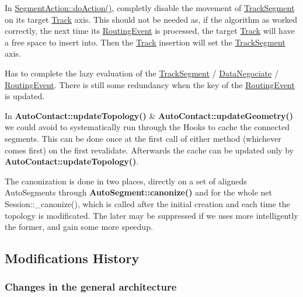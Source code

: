\begin{DoxyItemize}
\item In \mbox{\hyperlink{classKite_1_1SegmentAction_a324f17f0f5a09b76344eb2e003695d74}{Segment\+Action\+::do\+Action()}}, completly disable the movement of \mbox{\hyperlink{classKite_1_1TrackSegment}{Track\+Segment}} on it\textquotesingle{}s target \mbox{\hyperlink{classKite_1_1Track}{Track}} axis. This should not be needed as, if the algorithm as worked correctly, the next time it\textquotesingle{}s \mbox{\hyperlink{classKite_1_1RoutingEvent}{Routing\+Event}} is processed, the target \mbox{\hyperlink{classKite_1_1Track}{Track}} will have a free space to insert into. Then the \mbox{\hyperlink{classKite_1_1Track}{Track}} insertion will set the \mbox{\hyperlink{classKite_1_1TrackSegment}{Track\+Segment}} axis.
\item Has to complete the lazy evaluation of the \mbox{\hyperlink{classKite_1_1TrackSegment}{Track\+Segment}} / \mbox{\hyperlink{classKite_1_1DataNegociate}{Data\+Negociate}} / \mbox{\hyperlink{classKite_1_1RoutingEvent}{Routing\+Event}}. There is still some redundancy when the key of the \mbox{\hyperlink{classKite_1_1RoutingEvent}{Routing\+Event}} is updated.
\item In \textbf{ Auto\+Contact\+::update\+Topology()} \& \textbf{ Auto\+Contact\+::update\+Geometry()} we could avoid to systematically run through the Hooks to cache the connected segments. This can be done once at the first call of either method (whichever comes first) on the first revalidate. Afterwards the cache can be updated only by \textbf{ Auto\+Contact\+::update\+Topology()}.
\item The canonization is done in two places, directly on a set of aligneds Auto\+Segments through \textbf{ Auto\+Segment\+::canonize()} and for the whole net Session\+::\+\_\+canonize(), which is called after the initial creation and each time the topology is modificated. The later may be suppressed if we uses more intelligently the former, and gain some more speedup.
\end{DoxyItemize}\hypertarget{pageNotes_secModificationsHistory}{}\subsection{Modifications History}\label{pageNotes_secModificationsHistory}
\hypertarget{pageNotes_ssecArchitectureChanges}{}\subsubsection{Changes in the general architecture}\label{pageNotes_ssecArchitectureChanges}

